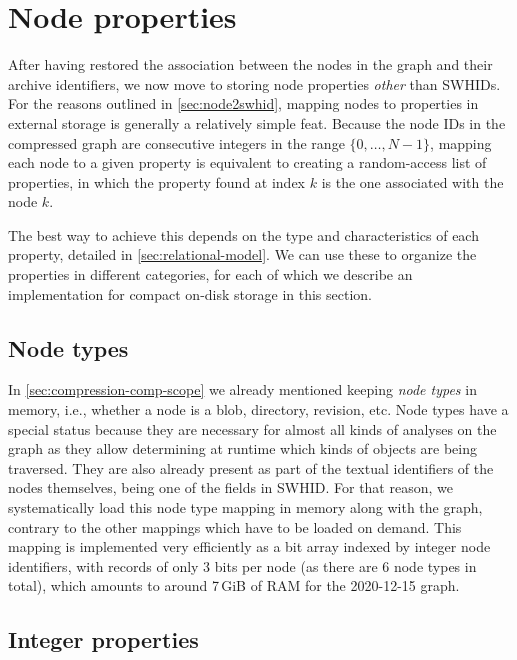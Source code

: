 \section{Node properties}%
\label{sec:node-properties}

After having restored the association between the nodes in the graph and their
archive identifiers, we now move to storing node properties \emph{other} than
\glspl{SWHID}.
For the reasons outlined in \cref{sec:node2swhid}, mapping nodes to properties
in external storage is generally a relatively simple feat. Because the node IDs
in the compressed graph are consecutive integers in the range
$\{0,\ldots,N-1\}$, mapping each node to a given property is equivalent to
creating a random-access list of properties, in which the property found at
index $k$ is the one associated with the node $k$.

The best way to achieve this depends on the type and characteristics of each
property, detailed in \cref{sec:relational-model}. We can use these to organize
the properties in different categories, for each of which we describe an
implementation for compact on-disk storage in this section.

\subsection{Node types}%
\label{sec:mapping-types}

In \cref{sec:compression-comp-scope} we already mentioned keeping \emph{node
types} in memory, i.e., whether a node is a blob, directory, revision, etc.
Node types have a special status because they are necessary for almost all
kinds of analyses on the graph as they allow determining at runtime which
kinds of objects are being traversed. They are also
already present as part of the textual identifiers of the nodes themselves,
being one of the fields in \gls{SWHID}. For that reason, we systematically
load this node type mapping in memory along with the graph, contrary to the
other mappings which have to be loaded on demand.
This mapping is implemented very efficiently as a bit array indexed by integer
node identifiers, with records of only 3 bits per node (as there are 6 node
types in total), which amounts to around 7\,GiB of RAM for the 2020-12-15
graph.

\subsection{Integer properties}%
\label{sec:mapping-integers}

